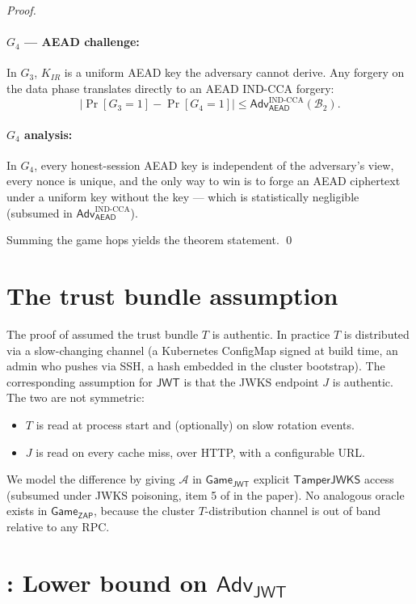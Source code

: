 \documentclass[11pt,a4paper]{article}
\theoremstyle{plain}
\theoremstyle{definition}
\newcommand{\Adv}{\mathsf{Adv}}
\newcommand{\GameG}{\mathsf{Game}}
\newcommand{\AEAD}{\mathsf{AEAD}}
\newcommand{\JWT}{\mathsf{JWT}}
\newcommand{\ZAP}{\mathsf{ZAP}}
\begin{document}
\begin{proof}
\paragraph{$G_4$ --- AEAD challenge:} In $G_3$, $K_{IR}$ is a uniform AEAD
key the adversary cannot derive. Any forgery on the data phase translates
directly to an AEAD IND-CCA forgery:
\[
|\Pr[G_3 = 1] - \Pr[G_4 = 1]| \le \Adv_{\AEAD}^{\mathrm{IND\text{-}CCA}}(\mathcal{B}_2).
\]

\paragraph{$G_4$ analysis:} In $G_4$, every honest-session AEAD key is
independent of the adversary's view, every nonce is unique, and the only
way to win is to forge an AEAD ciphertext under a uniform key without the
key --- which is statistically negligible (subsumed in
$\Adv_{\AEAD}^{\mathrm{IND\text{-}CCA}}$).

Summing the game hops yields the theorem statement. \qed
\end{proof}

\section{The trust bundle assumption}
\label{sec:trustbundle}

The proof of  assumed the trust bundle $T$ is authentic. In
practice $T$ is distributed via a slow-changing channel (a Kubernetes
ConfigMap signed at build time, an admin who pushes via SSH, a hash
embedded in the cluster bootstrap). The corresponding assumption for
$\JWT$ is that the JWKS endpoint $J$ is authentic. The two are not
symmetric:
\begin{itemize}[itemsep=2pt,topsep=2pt]
  \item $T$ is read at process start and (optionally) on slow rotation
        events.
  \item $J$ is read on every cache miss, over HTTP, with a configurable
        URL.
\end{itemize}

We model the difference by giving $\mathcal{A}$ in $\GameG_\JWT$ explicit
$\mathsf{TamperJWKS}$ access (subsumed under JWKS poisoning, item 5 of
 in the paper). No analogous oracle exists in
$\GameG_\ZAP$, because the cluster $T$-distribution channel is out of band
relative to any RPC.

\section{: Lower bound on $\Adv_\JWT$}
\end{document}
